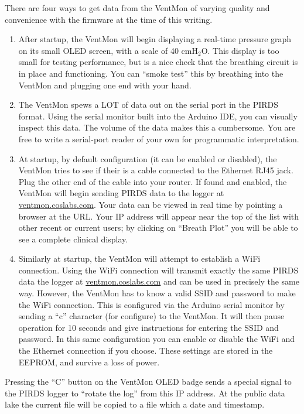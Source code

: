 \documentclass[11pt, letterpaper]{article}
\begin{document}
There are four ways to get data from the VentMon of varying quality and convenience with the firmware at the time of this writing.
\begin{enumerate}
\item After startup, the VentMon will begin displaying a real-time pressure graph on its small OLED screen, with a scale of 40 cmH$_2$O. This display is too small for testing performance, but is a nice check that the breathing circuit is in place and functioning. You can ``smoke test'' this by breathing into the VentMon and plugging one end with your hand.
\item The VentMon spews a LOT of data out on the serial port in the PIRDS format. Using the serial monitor built into the Arduino IDE, you can visually inspect this data. The volume of the data makes this a cumbersome. You are free to write a serial-port reader of your own for programmatic interpretation.
\item At startup, by default configuration (it can be enabled or disabled), the VentMon tries to see if their is a cable connected to the Ethernet RJ45 jack. Plug the other end of the cable into your router. If found and enabled, the VentMon will begin sending PIRDS\cite{PIRDS} data to the logger at \url{ventmon.coslabs.com}\cite{PIRDSlogger}. Your data can be viewed in real time by pointing a browser at the URL. Your IP address will appear near the top of the list with other recent or current users; by clicking on ``Breath Plot'' you will be able to see a complete clinical display.
\item Similarly at startup, the VentMon will attempt to establish a WiFi connection. Using the WiFi connection will transmit exactly the same PIRDS data the logger at \url{ventmon.coslabs.com} and can be used in precisely  the same way. However, the VentMon has to know a valid SSID and password to make the WiFi connection. This is configured via the Arduino serial monitor by sending a ``c'' character (for configure) to the VentMon. It will then pause operation for 10 seconds and give instructions for entering the SSID and password. In this same configuration you can enable or disable the WiFi and the Ethernet connection if you choose. These settings are stored in the EEPROM, and survive a loss of power.
\end{enumerate} 

Pressing the ``C'' button on the VentMon OLED badge sends a special signal to the PIRDS logger to ``rotate the log'' from this IP address. At the public data lake the current file will be copied to a file which a date and timestamp.
\end{document}
